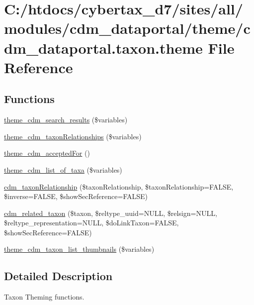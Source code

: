 \hypertarget{cdm__dataportal_8taxon_8theme}{\section{C\-:/htdocs/cybertax\-\_\-d7/sites/all/modules/cdm\-\_\-dataportal/theme/cdm\-\_\-dataportal.taxon.\-theme File Reference}
\label{cdm__dataportal_8taxon_8theme}
}
\subsection*{Functions}
\begin{DoxyCompactItemize}
\item 
\hyperlink{cdm__dataportal_8taxon_8theme_a4782f466e43c4e0b558822a6e3bb41c9}{theme\-\_\-cdm\-\_\-search\-\_\-results} (\$variables)
\item 
\hyperlink{cdm__dataportal_8taxon_8theme_a5b401cbd54f827eec4b82337a1fa34ed}{theme\-\_\-cdm\-\_\-taxon\-Relationships} (\$variables)
\item 
\hyperlink{cdm__dataportal_8taxon_8theme_aecad6778986483e773d5c31a615ed4ff}{theme\-\_\-cdm\-\_\-accepted\-For} ()
\item 
\hyperlink{cdm__dataportal_8taxon_8theme_acba31780b4e754f56d9c3681b9e0dac9}{theme\-\_\-cdm\-\_\-list\-\_\-of\-\_\-taxa} (\$variables)
\item 
\hyperlink{cdm__dataportal_8taxon_8theme_a74bdb75c27ae68dca250a7f2affd399d}{cdm\-\_\-taxon\-Relationship} (\$taxon\-Relationship, \$taxon\-Relationship=F\-A\-L\-S\-E, \$inverse=F\-A\-L\-S\-E, \$show\-Sec\-Reference=F\-A\-L\-S\-E)
\item 
\hyperlink{cdm__dataportal_8taxon_8theme_a998b6a18a693f8fc45fe3d71969eed0f}{cdm\-\_\-related\-\_\-taxon} (\$taxon, \$reltype\-\_\-uuid=N\-U\-L\-L, \$relsign=N\-U\-L\-L, \$reltype\-\_\-representation=N\-U\-L\-L, \$do\-Link\-Taxon=F\-A\-L\-S\-E, \$show\-Sec\-Reference=F\-A\-L\-S\-E)
\item 
\hyperlink{cdm__dataportal_8taxon_8theme_a0bb41a7cb48ed40f034542ae05718d27}{theme\-\_\-cdm\-\_\-taxon\-\_\-list\-\_\-thumbnails} (\$variables)
\end{DoxyCompactItemize}


\subsection{Detailed Description}
Taxon Theming functions.

